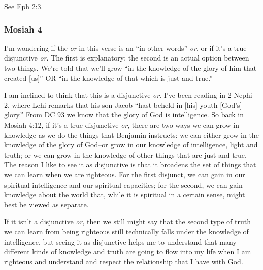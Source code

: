 		\begin{compactdesc}

		\item[16$\vert$]
		\begin{compactdesc}
		\item[by nature, they fall] See Eph 2:3. 
		\end{compactdesc}

		\end{compactdesc}

	\subsubsection{Mosiah 4} %

		\begin{compactdesc}

		\item[12$\vert$]
		\begin{compactdesc}
		\item[or] I'm wondering if the \textit{or} in this verse is an ``in other words'' \textit{or}, or if it's a true disjunctive \textit{or}. The first is explanatory; the second is an actual option between two things. We're told that we'll grow ``in the knowledge of the glory of him that created [us]'' OR ``in the knowledge of that which is just and true.''

		I am inclined to think that this is a disjunctive \textit{or}. I've been reading in 2 Nephi 2, where Lehi remarks that his son Jacob ``hast beheld in [his] youth [God's] glory.'' From DC 93 we know that the glory of God is intelligence. So back in Mosiah 4:12, if it's a true disjunctive \textit{or}, there are two ways we can grow in knowledge as we do the things that Benjamin instructs: we can either grow in the knowledge of the glory of God--or grow in our knowledge of intelligence, light and truth; or we can grow in the knowledge of other things that are just and true. The reason I like to see it as disjunctive is that it broadens the set of things that we can learn when we are righteous. For the first disjunct, we can gain in our spiritual intelligence and our spiritual capacities; for the second, we can gain knowledge about the world that, while it is spiritual in a certain sense, might best be viewed as separate. 

		If it isn't a disjunctive \textit{or}, then we still might say that the second type of truth we can learn from being righteous still technically falls under the knowledge of intelligence, but seeing it as disjunctive helps me to understand that many different kinds of knowledge and truth are going to flow into my life when I am righteous and understand and respect the relationship that I have with God.


\end{compactdesc}
\end{compactdesc}
